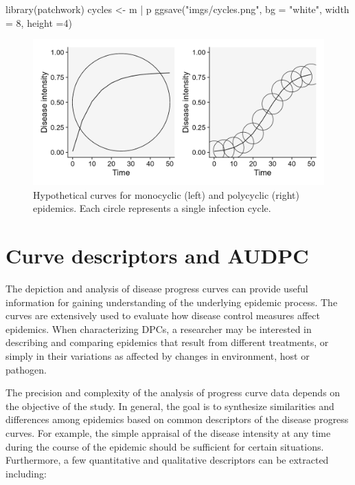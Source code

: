 \documentclass[
  letterpaper,
]{book}
\newenvironment{Shaded}{\begin{snugshade}}{\end{snugshade}}
\newcommand{\AttributeTok}[1]{\textcolor[rgb]{0.40,0.45,0.13}{#1}}
\newcommand{\DecValTok}[1]{\textcolor[rgb]{0.68,0.00,0.00}{#1}}
\newcommand{\FunctionTok}[1]{\textcolor[rgb]{0.28,0.35,0.67}{#1}}
\newcommand{\NormalTok}[1]{\textcolor[rgb]{0.00,0.23,0.31}{#1}}
\newcommand{\OtherTok}[1]{\textcolor[rgb]{0.00,0.23,0.31}{#1}}
\newcommand{\SpecialCharTok}[1]{\textcolor[rgb]{0.37,0.37,0.37}{#1}}
\newcommand{\StringTok}[1]{\textcolor[rgb]{0.13,0.47,0.30}{#1}}
\begin{document}
\begin{Shaded}
\begin{Highlighting}[]
\FunctionTok{library}\NormalTok{(patchwork)}
\NormalTok{cycles }\OtherTok{\textless{}{-}}\NormalTok{ m }\SpecialCharTok{|}\NormalTok{ p}
\FunctionTok{ggsave}\NormalTok{(}\StringTok{"imgs/cycles.png"}\NormalTok{, }\AttributeTok{bg =} \StringTok{"white"}\NormalTok{, }\AttributeTok{width =} \DecValTok{8}\NormalTok{, }\AttributeTok{height =}\DecValTok{4}\NormalTok{)}
\end{Highlighting}
\end{Shaded}

\begin{figure}

{\centering \includegraphics{imgs/cycles.png}

}

\caption{\label{fig-cycles}Hypothetical curves for monocyclic (left) and
polycyclic (right) epidemics. Each circle represents a single infection
cycle.}

\end{figure}

\hypertarget{curve-descriptors-and-audpc}{%
\section{Curve descriptors and
AUDPC}\label{curve-descriptors-and-audpc}}

The depiction and analysis of disease progress curves can provide useful
information for gaining understanding of the underlying epidemic
process. The curves are extensively used to evaluate how disease control
measures affect epidemics. When characterizing DPCs, a researcher may be
interested in describing and comparing epidemics that result from
different treatments, or simply in their variations as affected by
changes in environment, host or pathogen.

The precision and complexity of the analysis of progress curve data
depends on the objective of the study. In general, the goal is to
synthesize similarities and differences among epidemics based on common
descriptors of the disease progress curves. For example, the simple
appraisal of the disease intensity at any time during the course of the
epidemic should be sufficient for certain situations. Furthermore, a few
quantitative and qualitative descriptors can be extracted including:
\end{document}
